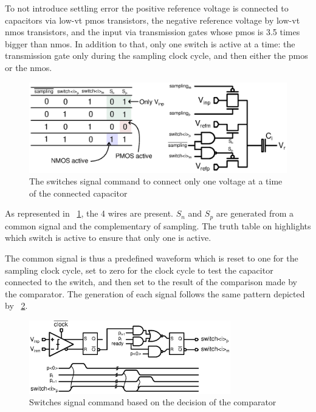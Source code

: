 To not introduce settling error the positive reference voltage is connected to capacitors via low-vt pmos transistors, the negative reference voltage by low-vt nmos transistors, and the input via transmission gates whose pmos is 3.5 times bigger than nmos. In addition to that, only one switch is active at a time: the transmission gate only during the sampling clock cycle, and then either the pmos or the nmos.

\begin{figure}[htp]
	\centering
	\includegraphics[width=\textwidth]{Chapter4/Figs/sar-switches-command-simp.ps}
	\caption{The switches signal command to connect only one voltage at a time of the connected capacitor}
	\label{fig:switches-command}
\end{figure}

As represented in \figurename~\ref{fig:switches-command}, the 4 wires are present. \(S_n\) and \(S_p\) are generated from a common signal and the complementary of sampling. The truth table on highlights which switch is active to ensure that only one is active.

The common signal is thus a predefined waveform which is reset to one for the sampling clock cycle, set to zero for the clock cycle to test the capacitor connected to the switch, and then set to the result of the comparison made by the comparator. The generation of each signal follows the same pattern depicted by \figurename~\ref{fig:comp-decision-switches}.

\begin{figure}[htp]
	\centering
	\includegraphics[width=0.78\textwidth]{Chapter4/Figs/comp-decisin-switches.ps}
	\caption{Switches signal command based on the decision of the comparator}
	\label{fig:comp-decision-switches}
\end{figure}

